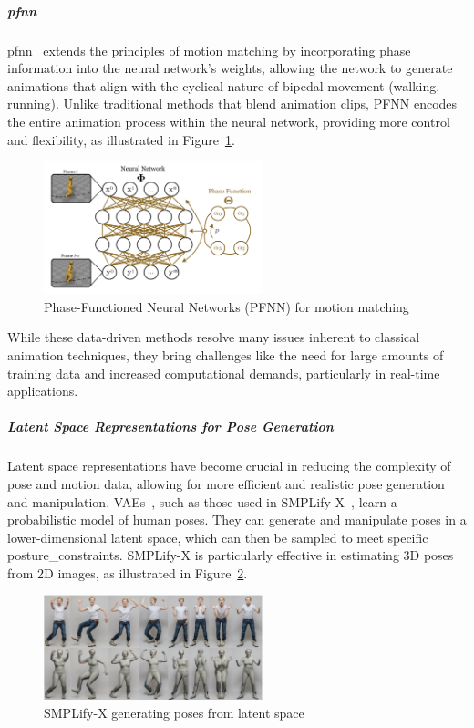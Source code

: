 \documentclass[../../main.tex]{subfiles}
\begin{document}
\subparagraph{\gls{pfnn}}
\label{ch:background_work:sign_language_synthesis:3d_techniques:avatar_animation:deep_learning:pfnn}

\gls{pfnn}~\cite{10.1145/3072959.3073663} extends the principles of motion matching by incorporating phase information into the neural network’s weights, allowing the network to generate animations that align with the cyclical nature of bipedal movement (walking, running). Unlike traditional methods that blend animation clips, PFNN encodes the entire animation process within the neural network, providing more control and flexibility, as illustrated in Figure~\ref{fig:pfnn}.

\begin{figure}
  \centering \includegraphics[width = 2.5in]{chapters/pose_correction/images/pfnn.png}
  \caption{Phase-Functioned Neural Networks (PFNN) for motion matching}
  \label{fig:pfnn}
\end{figure}

While these data-driven methods resolve many issues inherent to classical animation techniques, they bring challenges like the need for large amounts of training data and increased computational demands, particularly in real-time applications.

\subparagraph{Latent Space Representations for Pose Generation}
\label{ch:background_work:sign_language_synthesis:3d_techniques:avatar_animation:deep_learning:latent_space}

Latent space representations have become crucial in reducing the complexity of pose and motion data, allowing for more efficient and realistic pose generation and manipulation. VAEs~\cite{kingma2013auto}, such as those used in SMPLify-X~\cite{pavlakos2019expressive}, learn a probabilistic model of human poses. They can generate and manipulate poses in a lower-dimensional latent space, which can then be sampled to meet specific \gls{posture_constraint}s. SMPLify-X is particularly effective in estimating 3D poses from 2D images, as illustrated in Figure~\ref{fig:simplifyx}.

\begin{figure}
  \centering \includegraphics[width = 2.5in]{chapters/pose_correction/images/simplifyx.png}
  \caption{SMPLify-X generating poses from latent space}
  \label{fig:simplifyx}
\end{figure}
\end{document}
